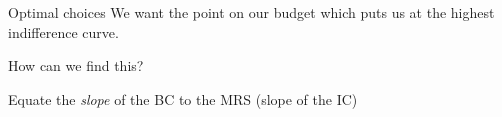 \documentclass[aspectratio=169]{beamer}
\begin{document}










\begin{frame}{Optimal choices}
    We want the point on our budget which puts us at the highest indifference curve.

    \vspace{2mm}

    How can we find this?

    \vspace{2mm}

    Equate the \textit{slope} of the BC to the MRS (slope of the IC)

    \vspace{2mm}


\end{frame}


\end{document}
